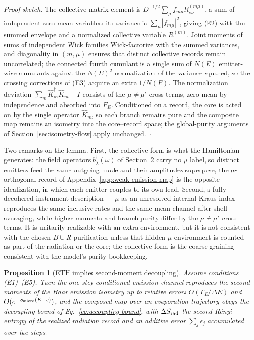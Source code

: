 \documentclass[12pt]{article}
\newcommand{\Smicro}{S_{\rm micro}}
\newtheorem{proposition}{Proposition}
\begin{document}
\emph{Proof sketch.}  The collective matrix element is
$D^{-1/2}\sum_\mu f_{m\mu}R^{(m\mu)}_{\bar\nu\nu}$, a sum of independent
zero-mean variables: its variance is $\sum_\mu|f_{m\mu}|^2$, giving (E2)
with the summed envelope and a normalized collective variable $R^{(m)}$.
Joint moments of sums of independent Wick families Wick-factorize with
the summed variances, and diagonality in $(m,\mu)$ ensures that distinct
collective records remain uncorrelated; the connected fourth cumulant is
a single sum
of $N(E)$ emitter-wise cumulants against the $N(E)^2$ normalization of
the variance squared, so the crossing corrections of (E3) acquire an
extra $1/N(E)$.  The normalization deviation
$\sum_m\widehat K_m^\dagger\widehat K_m-I$ consists of the
$\mu\neq\mu'$ cross terms, zero-mean by independence and absorbed into
$F_E$.  Conditioned on a record, the core is acted on by the
single operator $\widehat K_m$, so each branch remains pure and the
composite map remains an isometry into the core--record space; the
global-purity arguments of Section~\ref{sec:isometry-flow} apply
unchanged.  \hfill$\square$

Two remarks on the lemma.  First, the collective form is what the
Hamiltonian generates: the field operators $b_\lambda^\dagger(\omega)$ of
Section~2 carry no $\mu$ label, so distinct emitters feed the same
outgoing mode and their amplitudes superpose; the $\mu$-orthogonal record
of Appendix~\ref{app:weak-emission-map} is the opposite idealization, in
which each emitter couples to its own lead.  Second, a fully decohered
instrument description --- $\mu$ as an unresolved internal Kraus index
--- reproduces the same inclusive rates and the same mean channel after
shell averaging, while higher moments and branch purity differ by the
$\mu\neq\mu'$ cross terms.  It is unitarily realizable with an extra
environment, but it is not consistent with the chosen $B\cup R$
purification unless that hidden $\mu$ environment is counted as part of
the radiation or the core; the collective form is the coarse-graining
consistent with the model's purity bookkeeping.

\begin{proposition}[ETH implies second-moment decoupling]
\label{prop:eth-decoupling}
Assume conditions (E1)--(E5).  Then the one-step conditioned emission channel
reproduces the second moments of the Haar emission isometry up to relative
errors
$O(\Gamma_E/\Delta E)$ and $O(e^{-\Smicro(E-\omega)})$, and the composed map
over
an evaporation trajectory obeys the decoupling bound of
Eq.~\eqref{eq:decoupling-bound}, with $\Delta S_{\rm rad}$ the second R\'enyi
entropy of the realized radiation record and an additive error
$\sum_j\epsilon_j$ accumulated over the steps.
\end{proposition}
\end{document}
